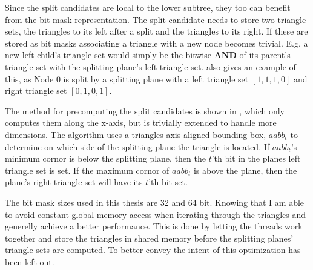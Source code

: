 
Since the split candidates are local to the lower subtree, they too
can benefit from the bit mask representation. The split candidate
needs to store two triangle sets, the triangles to its left after a
split and the triangles to its right. If these are stored as bit masks
associating a triangle with a new node becomes trivial. E.g. a new
left child's triangle set would simply be the bitwise \textbf{AND} of
its parent's triangle set with the splitting plane's left triangle
set.  also gives an example of this, as Node 0 is
split by a splitting plane with a left triangle set $[1,1,1,0]$ and
right triangle set $[0,1,0,1]$.

The method for precomputing the split candidates is shown in
, which only computes them along the
x-axis, but is trivially extended to handle more dimensions. The
algorithm uses a triangles axis aligned bounding box, $aabb_t$ to
determine on which side of the splitting plane the triangle is
located. If $aabb_t$'s minimum cornor is below the splitting plane,
then the $t$'th bit in the planes left triangle set is set. If the
maximum cornor of $aabb_t$ is above the plane, then the plane's right
triangle set will have its $t$'th bit set.


The bit mask sizes used in this thesis are 32 and 64 bit. Knowing that
I am able to avoid constant global memory access when iterating
through the triangles and generelly achieve a better performance. This
is done by letting the threads work together and store the triangles
in shared memory before the splitting planes' triangle sets are
computed. To better convey the intent of
 this optimization has been left out.


